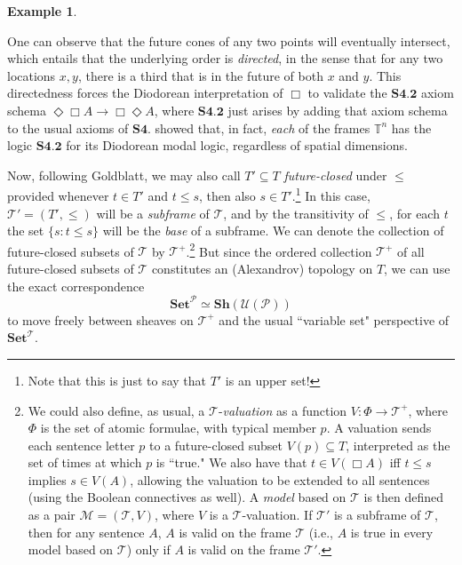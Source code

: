 \documentclass[11pt]{book}
\theoremstyle{definition}
\newtheorem{example}{Example}[section]
\theoremstyle{definition}
\theoremstyle{definition}
\theoremstyle{theorem}
\theoremstyle{definition}
\begin{document}
\begin{example}
\begin{center}
	\end{center} \par \noindent 
	One can observe that the future cones of any two points will eventually intersect, which entails that the underlying order is \textit{directed}, in the sense that for any two locations $x, y$, there is a third that is in the future of both $x$ and $y$. This directedness forces the Diodorean interpretation of $\Box$ to validate the $\textbf{S4.2}$ axiom schema $\Diamond \Box A \rightarrow \Box \Diamond A$, where $\textbf{S4.2}$ just arises by adding that axiom schema to the usual axioms of $\textbf{S4}$. \cite{goldblatt_diodorean_1980} showed that, in fact, \textit{each} of the frames $\mathbb{T}^n$ has the logic $\textbf{S4.2}$ for its Diodorean modal logic, regardless of spatial dimensions.\par 
	Now, following Goldblatt, we may also call $T' \subseteq  T$ \textit{future-closed} under $\leq$ provided whenever $t \in T'$ and $t \leq s$, then also $s \in T'$.\footnote{Note that this is just to say that $T'$ is an upper set!} In this case, $\mathcal{T}' = (T', \leq)$ will be a \textit{subframe} of $\mathcal{T}$, and by the transitivity of $\leq$, for each $t$ the set $\{s: t \leq s\}$ will be the \textit{base} of a subframe. We can denote the collection of future-closed subsets of $\mathcal{T}$ by $\mathcal{T}^+$.\footnote{We could also define, as usual, a $\mathcal{T}$-\textit{valuation} as a function $V: \Phi \rightarrow \mathcal{T}^+$, where $\Phi$ is the set of atomic formulae, with typical member $p$. A valuation sends each sentence letter $p$ to a future-closed subset $V(p) \subseteq  T$, interpreted as the set of times at which $p$ is ``true." We also have that $t \in V(\Box A)$ iff $t \leq s$ implies $s \in V(A)$, allowing the valuation to be extended to all sentences (using the Boolean connectives as well). A \textit{model} based on $\mathcal{T}$ is then defined as a pair $\mathcal{M} = (\mathcal{T}, V)$, where $V$ is a $\mathcal{T}$-valuation. If $\mathcal{T}'$ is a subframe of $\mathcal{T}$, then for any sentence $A$, $A$ is valid on the frame $\mathcal{T}$ (i.e., $A$ is true in every model based on $\mathcal{T}$) only if $A$ is valid on the frame $\mathcal{T}'$.} 
	But since the ordered collection $\mathcal{T}^+$ of all future-closed subsets of $\mathcal{T}$ constitutes an (Alexandrov) topology on $T$, we can use the exact correspondence 
	\begin{equation*}
	\textbf{Set}^{\mathcal{P}} \simeq \textbf{Sh}(\mathcal{U}(\mathcal{P}))
	\end{equation*}
	 to move freely between sheaves on $\mathcal{T}^+$ and the usual ``variable set" perspective of $\textbf{Set}^{\mathcal{T}}$. 
\end{example}
\end{document}
